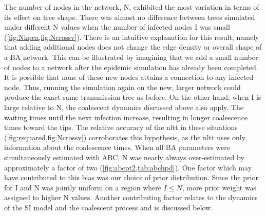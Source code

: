 The number of nodes in the network, \gls{N}, exhibited the most variation in
terms of its effect on tree shape. There was almost no difference between trees
simulated under different \gls{N} values when the number of infected nodes
\gls{I} was small (\cref{fig:Nkpca,fig:Ncrossv}). There is an intuitive
explanation for this result, namely that adding additional nodes does not
change the edge density or overall shape of a \gls{BA} network.  This can be illustrated by imagining that we add a small
number of nodes to a network after the epidemic simulation has already been
completed. It is possible that none of these new nodes attains a connection to
any infected node. Thus, running the simulation again on the new, larger
network could produce the exact same transmission tree as before. On the other
hand, when \gls{I} is large relative to \gls{N}, the coalescent dynamics
discussed above also apply. The waiting times until the next infection
increase, resulting in longer coalescence times toward the tips. The relative
accuracy of the \gls{nltt} in these situations
(\cref{fig:rsquared,fig:Ncrossv}) corroborates this hypothesis, as the
\gls{nltt} uses only information about the coalescence times. When all \gls{BA}
parameters were simultaneously estimated with \gls{ABC}, \gls{N} was nearly
always over-estimated by approximately a factor of two
(\cref{fig:abcpt2,tab:abchpd}). One factor which may have contributed to this
bias was our choice of prior distribution. Since the prior for \gls{I} and
\gls{N} was jointly uniform on a region where $I \leq N$, more prior weight was
assigned to higher \gls{N} values. Another contributing factor relates to the
dynamics of the \gls{SI} model and the coalescent process and is discussed
below.

